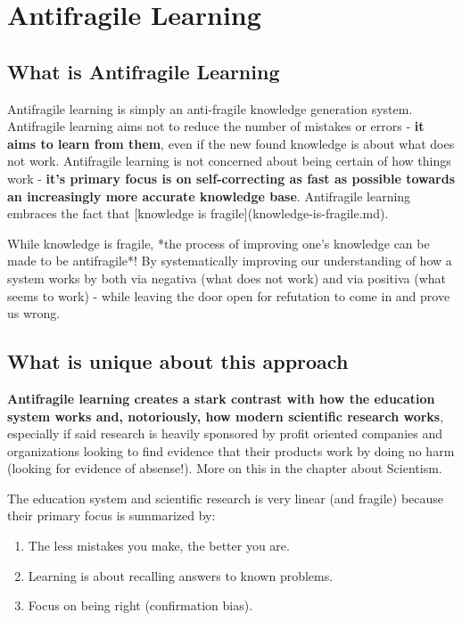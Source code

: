 \section{Antifragile Learning}

\subsection{What is Antifragile Learning}

Antifragile learning is simply an anti-fragile knowledge generation system. Antifragile learning aims not to reduce the number of mistakes or errors - \textbf{it aims to learn from them}, even if the new found knowledge is about what does not work. Antifragile learning is not concerned about being certain of how things work - \textbf{it's primary focus is on self-correcting as fast as possible towards an increasingly more accurate knowledge base}. Antifragile learning embraces the fact that [knowledge is fragile](knowledge-is-fragile.md).

While knowledge is fragile, *the process of improving one's knowledge can be made to be antifragile*! By systematically improving our understanding of how a system works by both via negativa (what does not work) and via positiva (what seems to work) - while leaving the door open for refutation to come in and prove us wrong.

\subsection{What is unique about this approach}

\textbf{Antifragile learning creates a stark contrast with how the education system works and, notoriously, how modern scientific research works}, especially if said research is heavily sponsored by profit oriented companies and organizations looking to find evidence that their products work by doing no harm (looking for evidence of absense!). More on this in the chapter about Scientism.

The education system and scientific research is very linear (and fragile) because their primary focus is summarized by:
\begin{enumerate}
	\item The less mistakes you make, the better you are.
	\item Learning is about recalling answers to known problems.
	\item Focus on being right (confirmation bias).
\end{enumerate}


